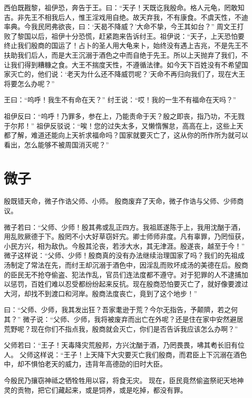 \documentclass[12pt,UTF8]{ctexbook}
\begin{document}
西伯既戡黎，祖伊恐，奔告于王。曰：“天子！天既讫我殷命。格人元龟，罔敢知吉。非先王不相我后人，惟王淫戏用自绝。故天弃我，不有康食。不虞天性，不迪率典。今我民罔弗欲丧，曰：‘天曷不降威？’大命不挚，今王其如台？”
周文王打败了黎国以后，祖伊十分恐慌，赶紧跑来告诉纣王。祖伊说：“天子，上天恐怕要终止我们殷商的国运了！占卜的圣人用大龟来卜，始终没有遇上吉兆，不是先王不扶助我们后人，而是大王沉溺于酒色之中而自绝于先王。所以上天抛弃了我们，不让我们得到糟糠之食。大王不揣度天性，不遵循法律。如今天下百姓没有不希望国家灭亡的，他们说：‘老天为什么还不降威罚呢？’天命不再归向我们了，现在大王将要怎么办呢？”

王曰：“呜呼！我生不有命在天？”
纣王说：“哎！我的一生不有福命在天吗？”

祖伊反曰：“呜呼！乃罪多，参在上，乃能责命于天？殷之即丧，指乃功，不无戮于尔邦！”
祖伊反驳说：“唉！您的过失太多，又懒惰懈怠，高高在上，这些上天都了解，难道还能向上天祈求福命吗？国家就要灭亡了，这从你的所作所为就可以看出，怎么能够不被周国消灭呢？”

\chapter{微子}

殷既错天命，微子作诰父师、小师。
殷商废弃了天命，微子作诰与父师、少师商议。

微子若曰：“父师、少师！殷其弗或乱正四方。我祖厎遂陈于上，我用沈酗于酒，用乱败厥德于下。殷罔不小大好草窃奸宄。卿士师师非度。凡有辜罪，乃罔恒获，小民方兴，相为敌仇。今殷其沦丧，若涉大水，其无津涯。殷遂丧，越至于今！”
微子这样说：“父师、少师！殷商真的没有办法继续治理国家了吗？我们的先祖成汤制定了常法在先，而纣王却沉溺于酒色中，因淫乱而败坏成汤的美德在后。殷商的臣民无不抢夺偷盗、犯法作乱，官员们连法度都不遵守。对于犯罪的人不逮捕加以惩罚，百姓们难以忍受都纷纷起来反抗。现在殷商恐怕要灭亡了，就好像要渡过大河，却找不到渡口和河岸。殷商法度丧亡，竟到了这个地步！”

曰：“父师、少师，我其发出狂？吾家耄逊于荒？今尔无指告，予颠隮，若之何其？”
微子说：“父师、少师，我将被废弃而出亡在外呢？还是住在家中安然避居荒野呢？现在你们不指点我，殷商就会灭亡，你们是否告诉我应该怎么办啊？”

父师若曰：“王子！天毒降灾荒殷邦，方兴沈酗于酒，乃罔畏畏，咈其耇长旧有位人。
父师这样说：“王子！上天降下大灾要灭亡我们殷商，而君臣上下沉溺在酒色中，却不惧怕老天的威力，违背年高德劭的旧时大臣。

今殷民乃攘窃神祗之牺牷牲用以容，将食无灾。
现在，臣民竟然偷盗祭祀天地神灵的贡物，把它们藏起来，或是饲养，或是吃掉，都没有罪。
\end{document}
